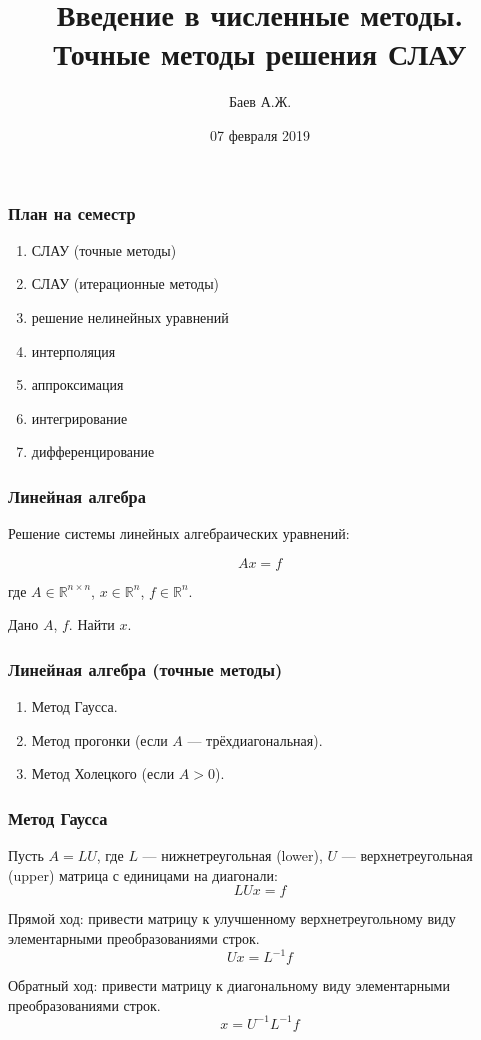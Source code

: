 \documentclass[10pt]{beamer}
\author{Баев А.Ж.}
\title{Введение в численные методы. \\ Точные методы решения СЛАУ}
\institute{Казахстанский филиал МГУ}
\date{07 февраля 2019}
\begin{document}
\maketitle


\begin{frame}[fragile]
\frametitle{План на семестр}

\begin{enumerate}
\item СЛАУ (точные методы)
\item СЛАУ (итерационные методы)
\item решение нелинейных уравнений
\item интерполяция 
\item аппроксимация
\item интегрирование
\item дифференцирование
\end{enumerate}

\end{frame}


\begin{frame}[fragile]
\frametitle{Линейная алгебра}

Решение системы линейных алгебраических уравнений:

$$A x = f$$

где $A \in \mathbb{R}^{n \times n}$, $x \in \mathbb{R}^{n}$, $f \in \mathbb{R}^{n}$.

Дано $A$, $f$. Найти $x$.

\end{frame}


\begin{frame}[fragile]
\frametitle{Линейная алгебра (точные методы)}

\begin{enumerate}
\item Метод Гаусса.
\item Метод прогонки (если $A$ --- трёхдиагональная).
\item Метод Холецкого (если $A > 0$).
\end{enumerate}

\end{frame}




\begin{frame}[fragile]
\frametitle{Метод Гаусса}

Пусть $A = L U$, где $L$ --- нижнетреугольная (lower), $U$ --- верхнетреугольная (upper) матрица с единицами на диагонали:
$$ L U x = f$$

Прямой ход: привести матрицу к улучшенному верхнетреугольному виду элементарными преобразованиями строк.
$$ U x = L^{-1} f$$

Обратный ход: привести матрицу к диагональному виду элементарными преобразованиями строк.
$$ x = U^{-1} L^{-1} f$$

\end{frame}
\end{document}
